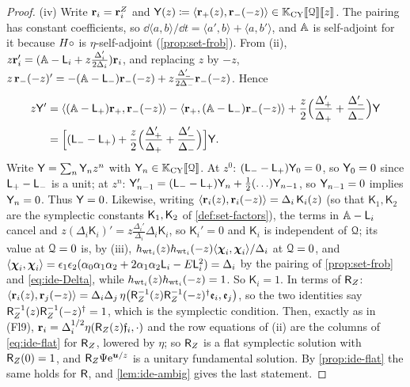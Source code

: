 \begin{proof}
(iv) Write $\mathbf{r}_i=\mathbf{r}^Z_i$ and $\mathsf{Y}(z)\coloneqq\langle\mathbf{r}_+(z),\mathbf{r}_-(-z)\rangle\in\mathbb{K}_{\mathrm{CY}}[\![ \mathcal{Q} ]\!][\![ z ]\!]$. The pairing has constant coefficients, so $\dd\langle a,b\rangle/\dd t=\langle a',b\rangle+\langle a,b'\rangle$, and $\mathbb{A}$ is self-adjoint for it because $H\circ$ is $\eta$-self-adjoint (\cref{prop:set-frob}). From (ii), $z\mathbf{r}_i'=(\mathbb{A}-\mathsf{L}_i+z\frac{\Delta_i'}{2\Delta_i})\mathbf{r}_i$, and replacing $z$ by $-z$, $z\,\mathbf{r}_-(-z)'=-(\mathbb{A}-\mathsf{L}_-)\mathbf{r}_-(-z)+z\frac{\Delta_-'}{2\Delta_-}\mathbf{r}_-(-z)$. Hence
\begin{align*}
z\mathsf{Y}'&=\langle(\mathbb{A}-\mathsf{L}_+)\mathbf{r}_+,\mathbf{r}_-(-z)\rangle-\langle\mathbf{r}_+,(\mathbb{A}-\mathsf{L}_-)\mathbf{r}_-(-z)\rangle+\frac z2\Big(\frac{\Delta_+'}{\Delta_+}+\frac{\Delta_-'}{\Delta_-}\Big)\mathsf{Y}\\
&=\Big[(\mathsf{L}_--\mathsf{L}_+)+\frac z2\Big(\frac{\Delta_+'}{\Delta_+}+\frac{\Delta_-'}{\Delta_-}\Big)\Big]\mathsf{Y} .
\end{align*}
Write $\mathsf{Y}=\sum_n\mathsf{Y}_nz^n$ with $\mathsf{Y}_n\in\mathbb{K}_{\mathrm{CY}}[\![ \mathcal{Q} ]\!]$. At $z^0$: $(\mathsf{L}_--\mathsf{L}_+)\mathsf{Y}_0=0$, so $\mathsf{Y}_0=0$ since $\mathsf{L}_+-\mathsf{L}_-$ is a unit; at $z^n$: $\mathsf{Y}_{n-1}'=(\mathsf{L}_--\mathsf{L}_+)\mathsf{Y}_n+\frac12(\ldots)\mathsf{Y}_{n-1}$, so $\mathsf{Y}_{n-1}=0$ implies $\mathsf{Y}_n=0$. Thus $\mathsf{Y}=0$. Likewise, writing $\langle\mathbf{r}_i(z),\mathbf{r}_i(-z)\rangle=\Delta_i\,\mathsf{K}_i(z)$ (so that $\mathsf{K}_1,\mathsf{K}_2$ are the symplectic constants $\mathsf{K}_{1},\mathsf{K}_{2}$ of \cref{def:set-factors}), the terms in $\mathbb{A}-\mathsf{L}_i$ cancel and $z(\Delta_i\mathsf{K}_i)'=z\frac{\Delta_i'}{\Delta_i}\Delta_i\mathsf{K}_i$, so $\mathsf{K}_i'=0$ and $\mathsf{K}_i$ is independent of $\mathcal{Q}$; its value at $\mathcal{Q}=0$ is, by (iii), $h_{\mathrm{wt}_i}(z)h_{\mathrm{wt}_i}(-z)\langle\boldsymbol{\chi}_i,\boldsymbol{\chi}_i\rangle/\Delta_i$ at $\mathcal{Q}=0$, and $\langle\boldsymbol{\chi}_i,\boldsymbol{\chi}_i\rangle=\epsilon_1\epsilon_2(\alpha_0\alpha_1\alpha_2+2\alpha_1\alpha_2\mathsf{L}_i-E\mathsf{L}_i^2)=\Delta_i$ by the pairing of \cref{prop:set-frob} and \cref{eq:ide-Delta}, while $h_{\mathrm{wt}_i}(z)h_{\mathrm{wt}_i}(-z)=1$. So $\mathsf{K}_i=1$. In terms of $\mathsf{R}_{Z}$: $\langle\mathbf{r}_i(z),\mathbf{r}_j(-z)\rangle=\Delta_i\Delta_j\,\eta\big(\mathsf{R}_{Z}^{-1}(z)\mathsf{R}_{Z}^{-1}(-z)^\dagger\mathfrak{e}_i,\mathfrak{e}_j\big)$, so the two identities say $\mathsf{R}_{Z}^{-1}(z)\mathsf{R}_{Z}^{-1}(-z)^\dagger=1$, which is the symplectic condition. Then, exactly as in (Fl9), $\mathbf{r}_i=\Delta_i^{1/2}\eta(\mathsf{R}_{Z}(z)\mathfrak{f}_i,\cdot)$ and the row equations of (ii) are the columns of \cref{eq:ide-flat} for $\mathsf{R}_{Z}$, lowered by $\eta$; so $\mathsf{R}_{Z}$ is a flat symplectic solution with $\mathsf{R}_{Z}(0)=1$, and $\mathsf{R}_{Z}\Psi\mathrm{e}^{\boldsymbol{u}/z}$ is a unitary fundamental solution. By \cref{prop:ide-flat} the same holds for $\mathsf{R}$, and \cref{lem:ide-ambig} gives the last statement.
\end{proof}

